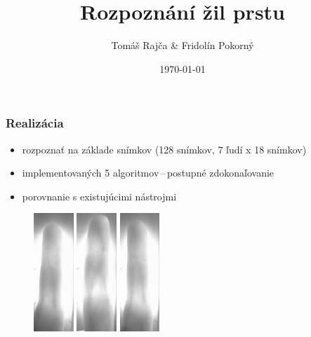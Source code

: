 \documentclass[compress]{beamer}
\begin{document}
\title{Rozpoznání žil prstu}
\author{Tomáš Rajča \& Fridolín Pokorný}
\date{\today}


\begin{frame}[plain]
  \titlepage
\end{frame}


\begin{frame}
  \frametitle{Realizácia}
  \begin{itemize}
    \item rozpoznať na základe snímkov (128 snímkov, 7 ľudí x 18 snímkov)
    \item implementovaných 5 algoritmov\,--\,postupné zdokonaľovanie
    \item porovnanie s existujúcimi nástrojmi
  \end{itemize}
\begin{figure}[ht!]
	\centering
	\includegraphics[width=1.5cm]{../fig/A_18.eps}
	\includegraphics[width=1.5cm]{../fig/A_10.eps}
	\includegraphics[width=1.5cm]{../fig/A_12.eps}
\end{figure}
\end{frame}
\end{document}
